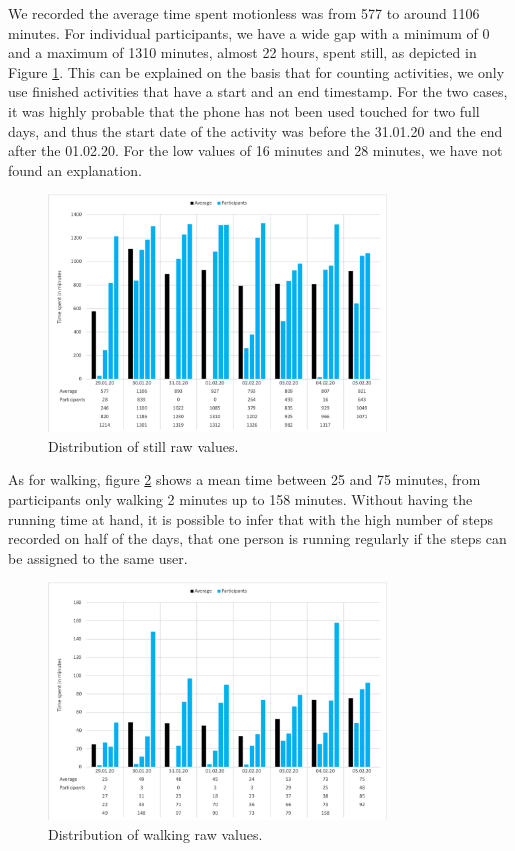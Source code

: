 
We recorded the average time spent motionless was from 577 to around 1106 minutes. For individual participants, we have a wide gap with a minimum of 0 and a maximum of 1310 minutes, almost 22 hours, spent still, as depicted in Figure \ref{fig:diagram_still}. This can be explained on the basis that for counting activities, we only use finished activities that have a start and an end timestamp. For the two cases, it was highly probable that the phone has not been used touched for two full days, and thus the start date of the activity was before the 31.01.20 and the end after the 01.02.20. For the low values of 16 minutes and 28 minutes, we have not found an explanation. 

\begin{figure}[htbp]
  \centering
  \includegraphics[width=0.8\textwidth]{figures/diagram_still}
  \caption{Distribution of still raw values.} \label{fig:diagram_still}
\end{figure}

As for walking, figure \ref{fig:diagram_walking} shows a mean time between 25 and 75 minutes, from participants only walking 2 minutes up to 158 minutes. Without having the running time at hand, it is possible to infer that with the high number of steps recorded on half of the days, that one person is running regularly if the steps can be assigned to the same user.

\begin{figure}[htbp]
  \centering
  \includegraphics[width=0.8\textwidth]{figures/diagram_walking.png}
  \caption{Distribution of walking raw values.} \label{fig:diagram_walking}
\end{figure}

